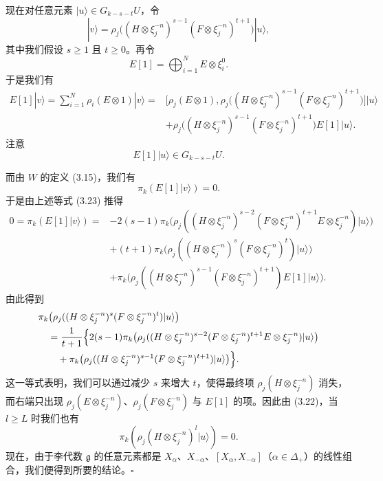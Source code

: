 现在对任意元素 $|u\rangle\in G_{k-s-t}U$，令
\[
|v\rangle=\rho_j\bigl((H\otimes\xi_j^{-n})^{s-1}(F\otimes\xi_j^{-n})^{t+1}\bigr)|u\rangle,
\]
其中我们假设 $s\ge1$ 且 $t\ge0$。再令
\[
E[1]=\bigoplus_{i=1}^{N}E\otimes\xi_i^{0}.
\]
于是我们有
\begin{equation}
\begin{aligned}
E[1]|v\rangle=\sum_{i=1}^{N}\rho_i(E\otimes1)|v\rangle
={}&\bigl[\rho_j(E\otimes1),\rho_j\bigl((H\otimes\xi_j^{-n})^{s-1}(F\otimes\xi_j^{-n})^{t+1}\bigr)\bigr]|u\rangle\\
&+\rho_j\bigl((H\otimes\xi_j^{-n})^{s-1}(F\otimes\xi_j^{-n})^{t+1}\bigr)E[1]|u\rangle.
\end{aligned} \tag{3.23}
\end{equation}
注意
\[
E[1]|u\rangle\in G_{k-s-t}U.
\]


而由 $W$ 的定义 (3.15)，我们有
\[
\pi_k(E[1]|v\rangle)=0.
\]
于是由上述等式 (3.23) 推得
\[
\begin{aligned}
0=\pi_k(E[1]|v\rangle)={}&-2(s-1)\pi_k\bigl(\rho_j((H\otimes\xi_j^{-n})^{s-2}(F\otimes\xi_j^{-n})^{t+1}E\otimes\xi_j^{-n})|u\rangle\bigr)\\
&+(t+1)\pi_k\bigl(\rho_j((H\otimes\xi_j^{-n})^{s}(F\otimes\xi_j^{-n})^{t})|u\rangle\bigr)\\
&+\pi_k\bigl(\rho_j((H\otimes\xi_j^{-n})^{s-1}(F\otimes\xi_j^{-n})^{t+1})E[1]|u\rangle\bigr).
\end{aligned}
\]
由此得到
\[
\begin{aligned}
&\pi_k\bigl(\rho_j((H\otimes\xi_j^{-n})^{s}(F\otimes\xi_j^{-n})^{t})|u\rangle\bigr)\\
&\quad=\frac{1}{t+1}\Bigl\{2(s-1)\pi_k\bigl(\rho_j((H\otimes\xi_j^{-n})^{s-2}(F\otimes\xi_j^{-n})^{t+1}E\otimes\xi_j^{-n})|u\rangle\bigr)\\
&\qquad+\pi_k\bigl(\rho_j((H\otimes\xi_j^{-n})^{s-1}(F\otimes\xi_j^{-n})^{t+1})|u\rangle\bigr)\Bigr\}.
\end{aligned}
\]
这一等式表明，我们可以通过减少 $s$ 来增大 $t$，使得最终项 $\rho_j(H\otimes\xi_j^{-n})$ 消失，而右端只出现 $\rho_j(E\otimes\xi_j^{-n})$、$\rho_j(F\otimes\xi_j^{-n})$ 与 $E[1]$ 的项。因此由 (3.22)，当 $l\ge L$ 时我们也有
\[
\pi_k(\rho_j(H\otimes\xi_j^{-n})^{l}|u\rangle)=0.
\]
现在，由于李代数 $\mathfrak{g}$ 的任意元素都是 $X_{\alpha}$、$X_{-\alpha}$、$[X_{\alpha},X_{-\alpha}]$（$\alpha\in\Delta_+$）的线性组合，我们便得到所要的结论。\hfill$\square$

